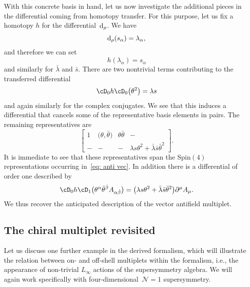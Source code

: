 \documentclass[10pt,a4paper]{amsart}
\numberwithin{equation}{section}
\def\d{{\rm d}}
\begin{document}
With this concrete basis in hand, let us now investigate the additional pieces in the differential coming from homotopy transfer. For this purpose, let us fix a homotopy $h$ for the differential~$\d_\rho$. We have
\begin{equation*}
\d_\rho (s_\alpha) = \lambda_\alpha ,
\end{equation*}
and therefore we can set
\begin{equation*}
h(\lambda_\alpha) = s_\alpha
\end{equation*}
and similarly for $\bar{\lambda}$ and $\bar{s}$. There are two nontrivial terms contributing to the transferred differential
\begin{equation*}
\cD_0 h \cD_0 \big(\theta^2\big) = \lambda s
\end{equation*}
and again similarly for the complex conjugates. We see that this induces a differential that cancels some of the representative basis elements in pairs. The remaining representatives are
\begin{equation*} %
\begin{bmatrix}
1 & \big(\theta,\bar{\theta}\big) & \theta \bar{\theta} & -\\
- & - & - & \lambda s \theta^2 + \bar{\lambda} \bar{s} \bar{\theta}^2
\end{bmatrix}.
\end{equation*}
It is immediate to see that these representatives span the $\mathrm{Spin}(4)$ representations occurring in~\eqref{eq: anti vec}. In addition there is a differential of order one described by
\begin{equation*}
\cD_0 h \cD_1 \big(\theta^\alpha \bar{\theta}^{\dot{\beta}} A_{\alpha \dot{\beta}} \big) = \big(\lambda s \theta^2 + \bar{\lambda} \bar{s} \bar{\theta}^2\big) \partial^\mu A_\mu .
\end{equation*}
We thus recover the anticipated description of the vector antifield multiplet.

\subsection{The chiral multiplet revisited}
Let us discuss one further example in the derived formalism, which will illustrate the relation between on- and off-shell multiplets within the formalism, i.e., the appearance of non-trivial $L_\infty$ actions of the supersymmetry algebra. We will again work specifically with four-dimensional~$\mathcal N=1$ supersymmetry.
\end{document}
